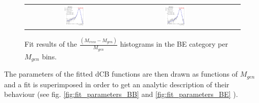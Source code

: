 \begin{figure}[ht]
\begin{center}
\begin{tabular}{cccc}
      \includegraphics[width=0.22\textwidth]{figures/Zprime/2017/mass_resolution/High_Mass/BE_3500_4500} &
      \includegraphics[width=0.22\textwidth]{figures/Zprime/2017/mass_resolution/High_Mass/BE_4500_5000}\\
    \end{tabular}
    \caption{Fit results of the $\frac{(M_{reco} - M_{gen})}{M_{gen}}$ histograms in the BE category per $M_{gen}$ bins.
    \label{fig:fit_BE}}
  \end{center}
\end{figure}

The parameters of the fitted dCB functions are then drawn as functions of $M_{gen}$ and a fit is superimposed in order to get an analytic description of their behaviour (see fig. \ref{fig:fit_parameters_BB} and \ref{fig:fit_parameters_BE} ).

